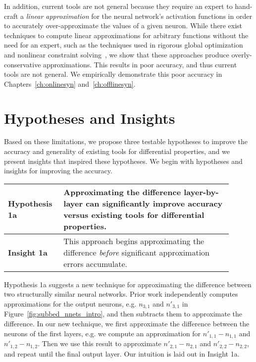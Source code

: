 In addition, current tools are not general because they require an expert to
hand-craft a \textit{linear approximation} for the neural network's activation
functions in order to accurately over-approximate the values of a given neuron.
While there exist techniques to compute linear approximations for arbitrary
functions without the need for an expert, such as the techniques used in rigorous global
optimization~\cite{chabert2009contractor,trombettoni2011inner} and nonlinear
constraint solving~\cite{gao2013dreal}, we
show that these approaches produce overly-conservative approximations. This
results in poor accuracy, and thus current tools are not general. We
empirically demonstrate this poor accuracy in Chapters~\ref{ch:onlinesyn}
and~\ref{ch:offlinesyn}.


\section{Hypotheses and Insights}
Based on these limitations, we propose three testable hypotheses to improve the
accuracy and generality of existing tools for differential properties, and we
present insights that inspired these hypotheses. We begin with hypotheses and
insights for improving the accuracy.

\begin{table}[h]
	\centering
	\large
	\begin{tabular}{|p{0.2\linewidth}|p{0.7\linewidth}|} \hline
		\textbf{Hypothesis 1a}      &
		Approximating the difference layer-by-layer can significantly improve
		accuracy versus existing tools for differential properties. \\ \hline
		\textbf{Insight 1a}        &
		This approach begins approximating the difference \textit{before}
		significant approximation errors accumulate. \\ \hline
	\end{tabular}
\end{table}

Hypothesis 1a suggests a new technique for approximating the difference between
two structurally similar neural networks. Prior work independently computes
approximations for the output neurons, e.g. $ n_{3,1} $ and $ n'_{3,1} $ in
Figure~\ref{fig:subbed_nnets_intro}, and then subtracts them to approximate the
difference. In our
new technique, we first approximate the difference between the neurons of the
first layers, e.g. we compute an approximation for $ n'_{1,1} - n_{1,1} $ and $
n'_{1,2} - n_{1,2} $. Then we use this result to approximate $ n'_{2,1} - n_{2,1}
$ and $ n'_{2,2} - n_{2,2} $, and repeat until the final output layer. Our
intuition is laid out in Insight 1a.

